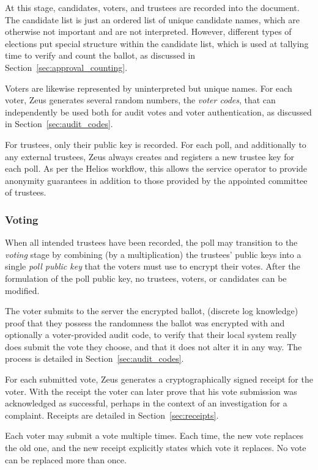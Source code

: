 \documentclass[jets]{usenixjournal}
\begin{document}
At this stage, candidates, voters, and trustees
are recorded into the document.
The candidate list is just an ordered list of unique candidate names,
which are otherwise not important and are not interpreted.
However, different types of elections put special structure
within the candidate list, which is used at tallying time
to verify and count the ballot,
as discussed in Section~\ref{sec:approval_counting}.

Voters are likewise represented by uninterpreted but unique names.
For each voter,
Zeus generates several random numbers, the \emph{voter codes}, that can
independently be used both for audit votes and voter authentication,
as discussed in Section~\ref{sec:audit_codes}.

For trustees, only their public key is recorded.
For each poll, and additionally to any external trustees,
Zeus always creates and registers a new trustee key for each poll.
As per the Helios workflow, this allows the service operator to
provide anonymity guarantees in addition to those provided by
the appointed committee of trustees.

\subsubsection{Voting}
\label{sec:voting}
When all intended trustees have been recorded,
the poll may transition to the \emph{voting} stage
by combining (by a multiplication)
the trustees' public keys into a single \emph{poll public key}
that the voters must use to encrypt their votes.
After the formulation of the poll public key,
no trustees, voters, or candidates can be modified.

The voter submits to the server the encrypted ballot, (discrete
log knowledge) proof that they possess the randomness the ballot was
encrypted with and optionally a voter-provided audit code, to verify
that their local system really does submit the vote they choose,
and that it does not alter it in any way.
The process is detailed in Section~\ref{sec:audit_codes}.

For each submitted vote, Zeus generates a cryptographically signed
receipt for the voter. With the receipt the voter can later prove that
his vote submission was acknowledged as successful, perhaps in the
context of an investigation for a complaint. Receipts are detailed in
Section~\ref{sec:receipts}.

Each voter may submit a vote multiple times.
Each time, the new vote replaces the old one,
and the new receipt explicitly states which vote it replaces.
No vote can be replaced more than once.
\end{document}

